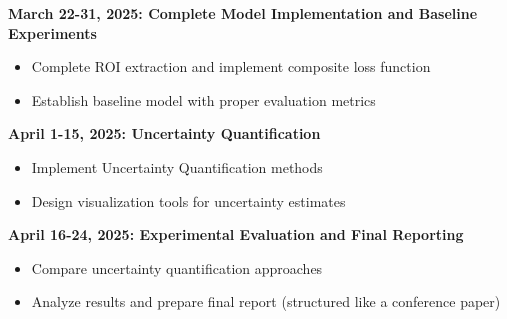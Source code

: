\documentclass{report}
\begin{document}
\textbf{March 22-31, 2025: Complete Model Implementation and Baseline Experiments}
\begin{itemize}
    \item Complete ROI extraction and implement composite loss function
    \item Establish baseline model with proper evaluation metrics
\end{itemize}

\textbf{April 1-15, 2025: Uncertainty Quantification}
\begin{itemize}
    \item Implement Uncertainty Quantification methods
    \item Design visualization tools for uncertainty estimates
\end{itemize}

\textbf{April 16-24, 2025: Experimental Evaluation and Final Reporting}
\begin{itemize}
    \item Compare uncertainty quantification approaches
    \item Analyze results and prepare final report (structured like a conference paper)
\end{itemize}

\printbibliography
\end{document}
